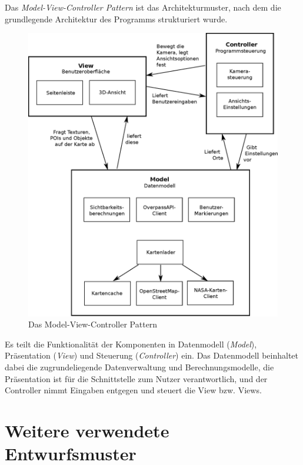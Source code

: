 \documentclass[10pt]{scrreprt}
\begin{document}
Das \textit{Model-View-Controller Pattern} ist das Architekturmuster, nach dem die grundlegende Architektur des Programms strukturiert wurde.\\
\begin{figure}[ht]
\begin{centering}
\includegraphics[scale=0.5]{ModelViewController.eps}
\caption{Das Model-View-Controller Pattern}
\end{centering}
\end{figure}

Es teilt die Funktionalität der Komponenten in Datenmodell (\textit{Model}), Präsentation (\textit{View}) und Steuerung (\textit{Controller}) ein. Das Datenmodell beinhaltet dabei die zugrundeliegende Datenverwaltung und  Berechnungsmodelle, die Präsentation ist für die Schnittstelle zum Nutzer verantwortlich, und der Controller nimmt Eingaben entgegen und steuert die View bzw. Views.

\newpage

\section{Weitere verwendete Entwurfsmuster}
\end{document}
